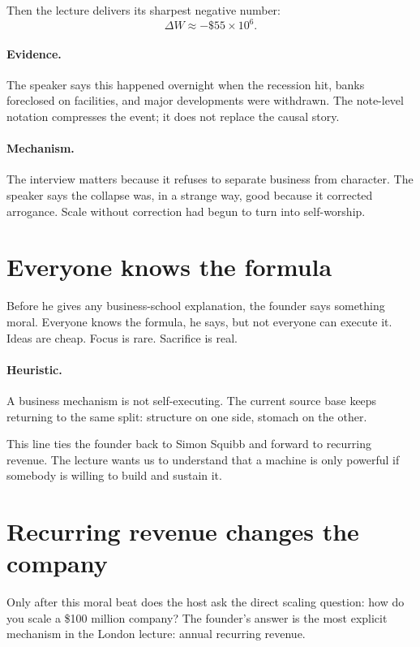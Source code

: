 \documentclass[11pt,oneside]{book}
\begin{document}
Then the lecture delivers its sharpest negative number:
\begin{equation}
\Delta W \approx -\$55 \times 10^6.
\end{equation}

\paragraph{Evidence.} The speaker says this happened overnight when the recession hit, banks foreclosed on facilities, and major developments were withdrawn. The note-level notation compresses the event; it does not replace the causal story.

\paragraph{Mechanism.} The interview matters because it refuses to separate business from character. The speaker says the collapse was, in a strange way, good because it corrected arrogance. Scale without correction had begun to turn into self-worship.

\section{Everyone knows the formula}

Before he gives any business-school explanation, the founder says something moral. Everyone knows the formula, he says, but not everyone can execute it. Ideas are cheap. Focus is rare. Sacrifice is real.

\paragraph{Heuristic.} A business mechanism is not self-executing. The current source base keeps returning to the same split: structure on one side, stomach on the other.

This line ties the founder back to Simon Squibb and forward to recurring revenue. The lecture wants us to understand that a machine is only powerful if somebody is willing to build and sustain it.

\section{Recurring revenue changes the company}

Only after this moral beat does the host ask the direct scaling question: how do you scale a \$100 million company? The founder's answer is the most explicit mechanism in the London lecture: annual recurring revenue.
\end{document}
